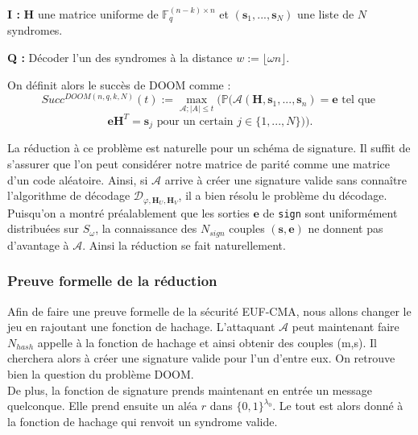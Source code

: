 \documentclass[12pt]{article}
\theoremstyle{plain}
\theoremstyle{definition}
\newcommand{\F}{\mathbb{F}}
\newcommand{\e}{\mathbf{e}}
\newcommand{\s}{\mathbf{s}}
\begin{document}
\leftskip=1cm
\noindent \textbf{I :} $\mathbf{H}$ une matrice uniforme de $\F_q^{(n-k)\times n}$ et $(\mathbf{s}_1,...,\mathbf{s}_N)$ une liste de $N$ syndromes. 

\noindent \textbf{Q :} Décoder l'un des syndromes à la distance $w := \lfloor \omega n \rfloor$. \\

\leftskip=0cm

\noindent On définit alors le succès de DOOM comme :
$$Succ^{DOOM(n,q,k,N)}(t) := \max_{\mathcal{A};|A|\leq t}(\mathbb{P}(\mathcal{A}(\mathbf{H},\mathbf{s}_1,...,\mathbf{s}_n)=\mathbf{e}\text{ tel que }$$
$$ \mathbf{eH}^T = \mathbf{s}_j \text{ pour un certain } j \in \{1,...,N\})).$$

\noindent La réduction à ce problème est naturelle pour un schéma de signature. Il suffit de s'assurer que l'on peut considérer notre matrice de parité comme une matrice d'un code aléatoire. Ainsi, si $\mathcal{A}$ arrive à créer une signature valide sans connaître l'algorithme de décodage $\mathcal{D}_{\varphi,\mathbf{H}_{U},\mathbf{H}_{V}}$, il a bien résolu le problème du décodage. Puisqu'on a montré préalablement que les sorties $\e$ de \verb|sign| sont uniformément distribuées sur $S_{\omega}$, la connaissance des $N_{sign}$ couples $(\s,\e)$ ne donnent pas d'avantage à $\mathcal{A}$. Ainsi la réduction se fait naturellement. \\


\subsubsection{Preuve formelle de la réduction}
Afin de faire une preuve formelle de la sécurité EUF-CMA, nous allons changer le jeu en rajoutant une fonction de hachage. L'attaquant $\mathcal{A}$ peut maintenant faire $N_{hash}$ appelle à la fonction de hachage et ainsi obtenir des couples (m,s). Il cherchera alors à créer une signature valide pour l'un d'entre eux. On retrouve bien la question du problème DOOM. \\
De plus, la fonction de signature prends maintenant en entrée un message quelconque. Elle prend ensuite un aléa $r$ dans $\{0,1\}^{\lambda_0}$. Le tout est alors donné à la fonction de hachage qui renvoit un syndrome valide. \\
\end{document}
